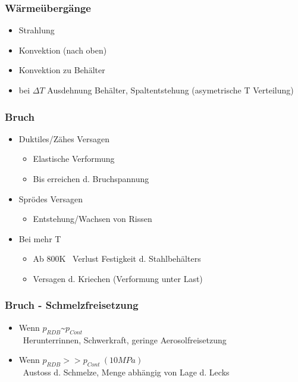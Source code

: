\documentclass[12pt]{article}
\begin{document}
\subsubsection{Wärmeübergänge}
\begin{itemize}
	\item Strahlung
	\item Konvektion (nach oben)
	\item Konvektion zu Behälter
	\item bei \(\Delta T\) Ausdehnung Behälter, Spaltentstehung (asymetrische T Verteilung)
\end{itemize}

\subsubsection{Bruch}
\begin{itemize}
	\item Duktiles/Zähes Versagen
		\begin{itemize}
			\item Elastische Verformung
			\item Bis erreichen d. Bruchspannung
		\end{itemize}
	\item Sprödes Versagen
		\begin{itemize}
			\item Entstehung/Wachsen von Rissen
		\end{itemize}
	\item Bei mehr T
		\begin{itemize}
			\item Ab 800K \textrightarrow\ Verlust Festigkeit d. Stahlbehälters
			\item Versagen d. Kriechen (Verformung unter Last)
		\end{itemize}
\end{itemize}

\subsubsection{Bruch - Schmelzfreisetzung}
\begin{itemize}
	\item Wenn \(p_{RDB} \text{\textasciitilde} p_{Cont}\)\\
		\textrightarrow\ Herunterrinnen, Schwerkraft, geringe Aerosolfreisetzung
	\item Wenn \(p_{RDB} >> p_{Cont}\ (10MPa)\)\\
		\textrightarrow\ Austoss d. Schmelze, Menge abhängig von Lage d. Lecks
\end{itemize}
\end{document}

